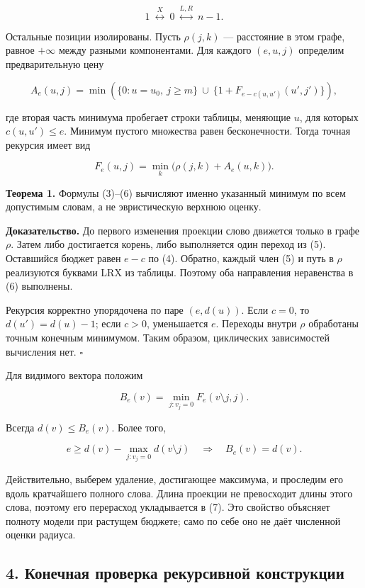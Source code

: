 \documentclass[
  11pt,
  a4paper,
]{article}
\begin{document}
\[1\ \overset{X}{\longleftrightarrow}\ 0\
\overset{L,R}{\longleftrightarrow}\ n-1.\]

Остальные позиции изолированы. Пусть \(\rho(j,k)\) --- расстояние в этом
графе, равное \(+\infty\) между разными компонентами. Для каждого
\((e,u,j)\) определим предварительную цену

\[A_e(u,j)=\min\left(
\{0:u=u_0,\ j\ge m\}\ \cup\
\{1+F_{e-c(u,u')}(u',j')\}\right), \tag{5}\]

где вторая часть минимума пробегает строки таблицы, меняющие \(u\), для
которых \(c(u,u')\le e\). Минимум пустого множества равен бесконечности.
Тогда точная рекурсия имеет вид

\[\boxed{F_e(u,j)=\min_k\bigl(\rho(j,k)+A_e(u,k)\bigr).} \tag{6}\]

\textbf{Теорема 1.} Формулы (3)--(6) вычисляют именно указанный минимум
по всем допустимым словам, а не эвристическую верхнюю оценку.

\textbf{Доказательство.} До первого изменения проекции слово движется
только в графе \(\rho\). Затем либо достигается корень, либо выполняется
один переход из (5). Оставшийся бюджет равен \(e-c\) по (4). Обратно,
каждый член (5) и путь в \(\rho\) реализуются буквами LRX из таблицы.
Поэтому оба направления неравенства в (6) выполнены.

Рекурсия корректно упорядочена по паре \((e,d(u))\). Если \(c=0\), то
\(d(u')=d(u)-1\); если \(c>0\), уменьшается \(e\). Переходы внутри
\(\rho\) обработаны точным конечным минимумом. Таким образом,
циклических зависимостей вычисления нет. \(\square\)

Для видимого вектора положим

\[B_e(v)=\min_{j:v_j=0}F_e(v\setminus j,j).\]

Всегда \(d(v)\le B_e(v)\). Более того,

\[e\ge d(v)-\max_{j:v_j=0}d(v\setminus j)
\quad\Longrightarrow\quad B_e(v)=d(v). \tag{7}\]

Действительно, выберем удаление, достигающее максимума, и проследим его
вдоль кратчайшего полного слова. Длина проекции не превосходит длины
этого слова, поэтому его перерасход укладывается в (7). Это свойство
объясняет полноту модели при растущем бюджете; само по себе оно не даёт
численной оценки радиуса.

\hypertarget{ux43aux43eux43dux435ux447ux43dux430ux44f-ux43fux440ux43eux432ux435ux440ux43aux430-ux440ux435ux43aux443ux440ux441ux438ux432ux43dux43eux439-ux43aux43eux43dux441ux442ux440ux443ux43aux446ux438ux438}{%
\subsection{4. Конечная проверка рекурсивной
конструкции}\label{ux43aux43eux43dux435ux447ux43dux430ux44f-ux43fux440ux43eux432ux435ux440ux43aux430-ux440ux435ux43aux443ux440ux441ux438ux432ux43dux43eux439-ux43aux43eux43dux441ux442ux440ux443ux43aux446ux438ux438}}
\end{document}
